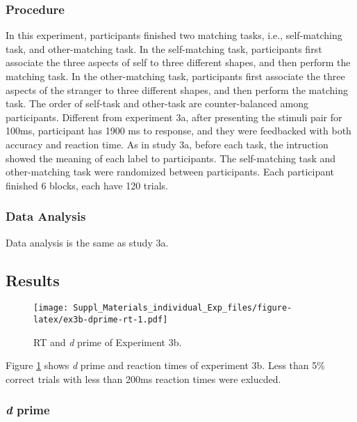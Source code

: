 \documentclass[man]{apa6}
\begin{document}
\hypertarget{procedure-5}{%
\subsubsection{Procedure}\label{procedure-5}}

In this experiment, participants finished two matching tasks, i.e., self-matching task, and other-matching task. In the self-matching task, participants first associate the three aspects of self to three different shapes, and then perform the matching task. In the other-matching task, participants first associate the three aspects of the stranger to three different shapes, and then perform the matching task. The order of self-task and other-task are counter-balanced among participants.
Different from experiment 3a, after presenting the stimuli pair for 100ms, participant has 1900 ms to response, and they were feedbacked with both accuracy and reaction time.
As in study 3a, before each task, the intruction showed the meaning of each label to participants. The self-matching task and other-matching task were randomized between participants. Each participant finished 6 blocks, each have 120 trials.

\hypertarget{data-analysis-4}{%
\subsubsection{Data Analysis}\label{data-analysis-4}}

Data analysis is the same as study 3a.

\hypertarget{results-5}{%
\subsection{Results}\label{results-5}}

\begin{figure}
\centering
\texttt{[image: Suppl\_Materials\_individual\_Exp\_files/figure-latex/ex3b-dprime-rt-1.pdf]}
\caption{\label{fig:ex3b-dprime-rt}RT and \emph{d} prime of Experiment 3b.}
\end{figure}

Figure \ref{fig:ex3b-dprime-rt} shows \emph{d} prime and reaction times of experiment 3b. Less than 5\% correct trials with less than 200ms reaction times were exlucded.

\hypertarget{d-prime-3}{%
\subsubsection{\texorpdfstring{\emph{d} prime}{d prime}}\label{d-prime-3}}
\end{document}
